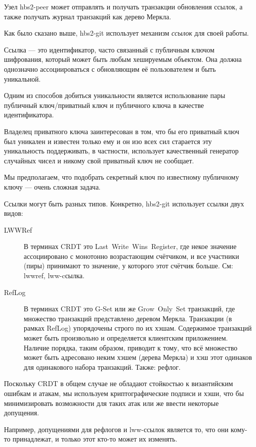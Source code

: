 \documentclass[11pt,a4paper]{article}
\newcommand{\term}[2]{\textit{#2}}
\begin{document}
Узел hbs2-peer может отправлять и получать транзакции обновления ссылок, а также получать журнал
транзакций как дерево Меркла.

Как было сказано выше, hbs2-git использует механизм \term{references}{ссылок} для своей работы.

Ссылка --- это идентификатор, часто связанный с публичным ключом шифрования, который может быть
любым хешируемым объектом. Она должна однозначно ассоциироваться с обновляющим её пользователем и
быть уникальной.

Одним из способов добиться уникальности является использование пары публичный
ключ/приватный ключ и публичного ключа в качестве идентификатора.

Владелец приватного ключа заинтересован в том, что бы его приватный ключ был уникален и известен
только ему и он изо всех сил старается эту уникальность поддерживать, в частности, использует
качественный генератор случайных чисел и никому свой приватный ключ не сообщает.

Мы предполагаем, что подобрать секретный ключ по известному публичному ключу --- очень
сложная задача.

Ссылки могут быть разных типов.  Конкретно, hbs2-git использует ссылки двух видов:

\begin{description}
  \item[LWWRef] В терминах CRDT это Last~Write~Wins~Register, где некое значение
    ассоциировано с монотонно возрастающим счётчиком, и все участники (пиры) принимают
    то значение, у которого этот счётчик больше. См: lwwref, lww-cсылка.

  \item[RefLog] В терминах CRDT это G-Set или же Grow~Only~Set транзакций, где множество
    транзакций представлено деревом Меркла. Транзакции (в рамках RefLog) упорядочены строго
    по их хэшам. Содержимое транзакций может быть произвольно и определяется клиентским приложением.
    Наличие порядка, таким образом, приводит к тому, что всё множество может быть адресовано
    неким хэшем (дерева Меркла) и хэш этот одинаков для одинакового набора транзакций. Также:
    рефлог.
\end{description}

Поскольку CRDT в общем случае не обладают стойкостью к византийским ошибкам и атакам, мы
используем криптографические подписи и хэши, что бы минимизировать возможности для таких
атак  или же ввести некоторые допущения.

Например, допущениями для рефлогов и lww-ссылок является то, что они кому-то принадлежат,
и только этот кто-то может их изменять.
\end{document}
